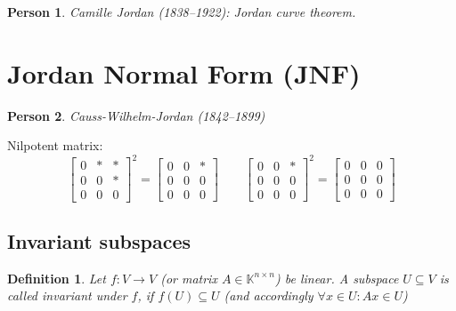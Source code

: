 \documentclass[a4paper]{article}
\newcounter{lecref}[section]
\numberwithin{lecref}{section}
\newtheorem{definition}[lecref]{Definition}
\newtheorem*{Person}{Person}
\begin{document}
\begin{Person}
  Camille Jordan (1838--1922): Jordan curve theorem.
\end{Person}

\section{Jordan Normal Form (JNF)} %

\begin{Person}
  Causs-Wilhelm-Jordan (1842--1899)
\end{Person}


Nilpotent matrix:
\[
  \begin{bmatrix} 0 & * & * \\ 0 & 0 & * \\ 0 & 0 & 0 \end{bmatrix}^2
  = \begin{bmatrix} 0 & 0 & * \\ 0 & 0 & 0 \\ 0 & 0 & 0 \end{bmatrix}
  \qquad
  \begin{bmatrix} 0 & 0 & * \\ 0 & 0 & 0 \\ 0 & 0 & 0 \end{bmatrix}^2
  = \begin{bmatrix} 0 & 0 & 0 \\ 0 & 0 & 0 \\ 0 & 0 & 0 \end{bmatrix}
\]

\subsection{Invariant subspaces}

\begin{definition} %
  Let $f: V \to V$ (or matrix $A \in \mathbb K^{n\times n}$) be linear.
  A subspace $U \subseteq V$ is called \emph{invariant} under $f$, if $f(U) \subseteq U$ (and accordingly $\forall x \in U: Ax \in U$)
\end{definition}
\end{document}
